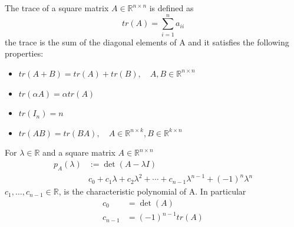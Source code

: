 \begin{definition}
    The trace of a square matrix $A \in \mathbb{R}^{n\times n}$ is defined as
    \[ 
        tr(A) = \sum_{i=1}^{n}{a_{ii}} 
    \]
    the trace is the sum of the diagonal elements of A and it satisfies the following properties:
    \begin{itemize}
        \item $tr(A+B) = tr(A) + tr(B), \quad A, B \in \mathbb{R}^{n\times n}$
        \item $tr(\alpha A) = \alpha tr(A)$
        \item $tr(I_n) = n$
        \item $tr(AB) = tr(BA), \quad A \in \mathbb{R}^{n\times k}, B \in \mathbb{R}^{k\times n}$
    \end{itemize}
\end{definition}
\begin{definition}
    For $\lambda \in \mathbb{R}$ and a square matrix $A \in \mathbb{R}^{n \times n}$
    \begin{align*}
        p_A(\lambda)&:= \det(A-\lambda I)\\
        & c_0 + c_1\lambda + c_2\lambda^2+ \cdots + c_{n-1}\lambda^{n-1}+(-1)^n\lambda ^n
    \end{align*}
    $c_{1}, \ldots,c_{n-1} \in \mathbb{R}$, is the characteristic polynomial of A. In particular
    \begin{align*}
        c_0 & = \det(A)\\
        c_{n-1} & = (-1)^{n-1} tr(A)
    \end{align*}
\end{definition}
